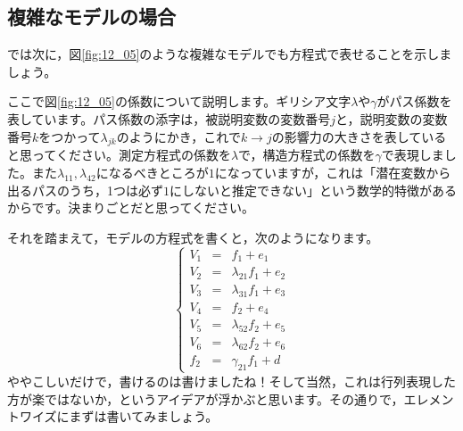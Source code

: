 \documentclass{ltjsbook}
\begin{document}
\subsection{複雑なモデルの場合}

では次に，図\ref{fig:12_05}のような複雑なモデルでも方程式で表せることを示しましょう。

ここで図\ref{fig:12_05}の係数について説明します。ギリシア文字$\lambda$や$\gamma$がパス係数を表しています。パス係数の添字は，被説明変数の変数番号$j$と，説明変数の変数番号$k$をつかって$\lambda_{jk}$のようにかき，これで$k \to j$の影響力の大きさを表していると思ってください。測定方程式の係数を$\lambda$で，構造方程式の係数を$\gamma$で表現しました。また$\lambda_{11},\lambda_{42}$になるべきところが$1$になっていますが，これは「潜在変数から出るパスのうち，1つは必ず$1$にしないと推定できない」という数学的特徴があるからです。決まりごとだと思ってください。

それを踏まえて，モデルの方程式を書くと，次のようになります。
\[ \left \{
	\begin{array}{rcl}
		V_1 & = & f_1 + e_1             \\
		V_2 & = & \lambda_{21}f_1 + e_2 \\
		V_3 & = & \lambda_{31}f_1 + e_3 \\
		V_4 & = & f_2 + e_4             \\
		V_5 & = & \lambda_{52}f_2 + e_5 \\
		V_6 & = & \lambda_{62}f_2 + e_6 \\
		f_2 & = & \gamma_{21}f_1 + d
	\end{array}
	\right .
\]
ややこしいだけで，書けるのは書けましたね！そして当然，これは行列表現した方が楽ではないか，というアイデアが浮かぶと思います。その通りで，エレメントワイズにまずは書いてみましょう。
\end{document}
